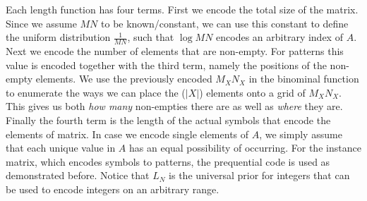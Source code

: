 \documentclass{llncs}
\begin{document}
Each length function has four terms. First we encode the total size of the matrix. Since we assume $MN$ to be known/constant, we can use this constant to define the uniform distribution $\frac{1}{MN}$, such that $\log{MN}$ encodes an arbitrary index of $A$. Next we encode the number of elements that are non-empty. For patterns this value is encoded together with the third term, namely the positions of the non-empty elements. We use the previously encoded $M_XN_X$ in the binominal function to enumerate the ways we can place the ($|X|$) elements onto a grid of $M_XN_X$. This gives us both \emph{how many} non-empties there are as well as \emph{where} they are. Finally the fourth term is the length of the actual symbols that encode the elements of matrix. In case we encode single elements of $A$, we simply assume that each unique value in $A$ has an equal possibility of occurring. For the instance matrix, which encodes symbols to patterns, the prequential code is used as demonstrated before. Notice that $L_N$ is the universal prior for integers\cite{univinteger} that can be used to encode integers on an arbitrary range.


\end{document}
